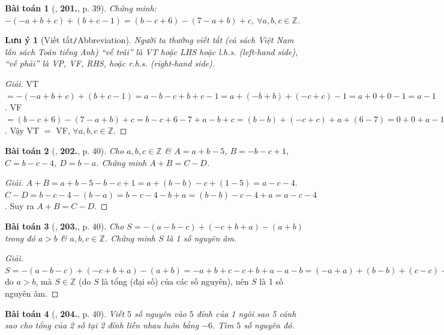 \documentclass{article}
\numberwithin{equation}{section}
\newtheorem{baitoan}{Bài toán}
\newtheorem{luuy}{Lưu ý}[section]
\begin{document}
\begin{baitoan}[\cite{Tuyen_Toan_6}, \textbf{201.}, p. 39]
	Chứng minh: $-(-a + b + c) + (b + c - 1) = (b - c + 6) - (7 - a + b) + c$, $\forall a,b,c\in\mathbb{Z}$.
\end{baitoan}

\begin{luuy}[Viết tắt\texttt{/}Abbreviation]
	Người ta thường viết tắt (cả sách Việt Nam lẫn sách Toán tiếng Anh) ``vế trái'' là VT hoặc LHS hoặc l.h.s. (left-hand side), ``vế phải'' là VP, VF, RHS, hoặc r.h.s. (right-hand side).
\end{luuy}

\begin{proof}[Giải]
	VT $= -(-a + b + c) + (b + c - 1) = a - b - c + b + c - 1 = a + (-b + b) + (-c + c) - 1 = a + 0 + 0 - 1 = a - 1$. VF $= (b - c + 6) - (7 - a + b) + c = b - c + 6 - 7 + a - b + c = (b - b) + (-c + c) + a + (6 - 7) = 0 + 0 + a - 1 = a - 1$. Vậy VT $=$ VF, $\forall a,b,c\in\mathbb{Z}$.
\end{proof}

\begin{baitoan}[\cite{Tuyen_Toan_6}, \textbf{202.}, p. 40]
	Cho $a,b,c\in\mathbb{Z}$ \& $A = a + b - 5$, $B = -b - c + 1$, $C = b - c - 4$, $D = b - a$. Chứng minh $A + B = C - D$.
\end{baitoan}

\begin{proof}[Giải]
	$A + B = a + b - 5 - b - c + 1 = a + (b - b) - c + (1 - 5) = a - c - 4$. $C - D = b - c - 4 - (b - a) = b - c - 4 - b + a = (b - b) - c - 4 + a = a - c - 4$. Suy ra $A + B = C - D$.
\end{proof}

\begin{baitoan}[\cite{Tuyen_Toan_6}, \textbf{203.}, p. 40]
	Cho $S = -(a - b - c) + (-c + b + a) - (a + b)$ trong đó $a > b$ \& $a,b,c\in\mathbb{Z}$. Chứng minh $S$ là 1 số nguyên âm.
\end{baitoan}

\begin{proof}[Giải]
	$S = -(a - b - c) + (-c + b + a) - (a + b) = -a + b + c - c + b + a - a - b = (-a + a) + (b - b) + (c - c) + b - a = 0 + 0 + 0 + b - a = b - a < 0$ do $a > b$, mà $S\in\mathbb{Z}$ (do $S$ là tổng (đại số) của các số nguyên), nên $S$ là 1 số nguyên âm.
\end{proof}

\begin{baitoan}[\cite{Tuyen_Toan_6}, \textbf{204.}, p. 40]
	Viết $5$ số nguyên vào $5$ đỉnh của 1 ngôi sao 5 cánh sao cho tổng của 2 số tại 2 đỉnh liền nhau luôn bằng $-6$. Tìm $5$ số nguyên đó.
\end{baitoan}
\end{document}
